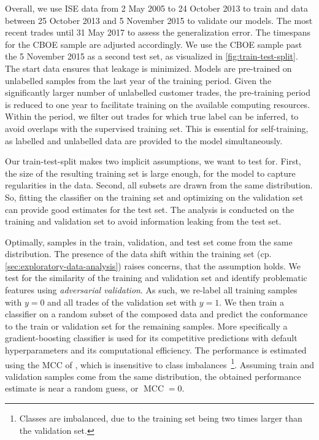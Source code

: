 Overall,  we use \gls{ISE} data from 2 May 2005 to 24 October 2013 to train and data between 25 October 2013 and 5 November 2015 to validate our models. The most recent trades until 31 May 2017 to assess the generalization error. The timespans for the \gls{CBOE} sample are adjusted accordingly. We use the \gls{CBOE} sample past the 5 November 2015 as a second test set, as visualized in \cref{fig:train-test-split}. The start data ensures that leakage is minimized. Models are pre-trained on unlabelled samples from the last year of the training period. Given the significantly larger number of unlabelled customer trades, the pre-training period is reduced to one year to facilitate training on the available computing resources. Within the period, we filter out trades for which true label can be inferred, to avoid overlaps with the supervised training set. This is essential for self-training, as labelled and unlabelled data are provided to the model simultaneously.

Our train-test-split makes two implicit assumptions, we want to test for. First, the size of the resulting training set is large enough, for the model to capture regularities in the data. Second, all subsets are drawn from the same distribution. So, fitting the classifier on the training set and optimizing on the validation set can provide good estimates for the test set. The analysis is conducted on the training and validation set to avoid information leaking from the test set.

Optimally, samples in the train, validation, and test set come from the same distribution. The presence of the data shift within the training set (cp. \cref{sec:exploratory-data-analysis}) raises concerns, that the assumption holds. We test for the similarity of the training and validation set and identify problematic features using \emph{adversarial validation}. As such, we re-label all training samples with $y=0$ and all trades of the validation set with $y=1$. We then train a classifier on a random subset of the composed data and predict the conformance to the train or validation set for the remaining samples. More specifically a gradient-boosting classifier is used for its competitive predictions with default hyperparameters and its computational efficiency. The performance is estimated using the \gls{MCC} of \textcite[][445]{matthewsComparisonPredictedObserved1975}, which is insensitive to class imbalances~\footnote{Classes are imbalanced, due to the training set being two times larger than the validation set.}. Assuming train and validation samples come from the same distribution, the obtained performance estimate is near a random guess, or $\operatorname{MCC} = 0$.

